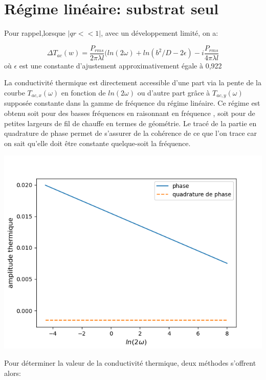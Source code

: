 \documentclass[10pt,a4paper]{report}
\begin{document}
\section{Régime linéaire: substrat seul}
Pour rappel,lorsque $\lvert qr<<1 \rvert$, avec un développement limité, on a:
\begin{center}
\begin{equation}
\Delta T_{ac}(w)=\frac{P_{rms}}{2\pi\lambda l}(ln(2\omega)+ln(b^2/D-2\epsilon)-i\frac{P_{rms}}{4\pi\lambda l}
\end{equation}
où $\epsilon$ est une constante d'ajustement approximativement égale à 0,922
\end{center}
La conductivité thermique est directement accessible d'une part via la pente de la courbe $T_{ac,x}(\omega)$ en fonction de $ln(2\omega)$ ou d'autre part grâce à $T_{ac,y}(\omega)$ supposée constante dans la gamme de fréquence du régime linéaire. Ce régime est obtenu soit pour des basses fréquences en raisonnant en fréquence , soit pour de petites largeurs de fil de chauffe en termes de géométrie.
\newline
\newline
Le tracé de la partie en quadrature de phase permet de s'assurer de la cohérence de ce que l'on trace car on sait qu'elle doit être constante quelque-soit la fréquence.
\begin{center}
\includegraphics[scale=0.6]{../schéma et graphes/graphe_linéaire.png}
\end{center}
Pour déterminer la valeur de la conductivité thermique, deux méthodes s'offrent alors:
\end{document}
